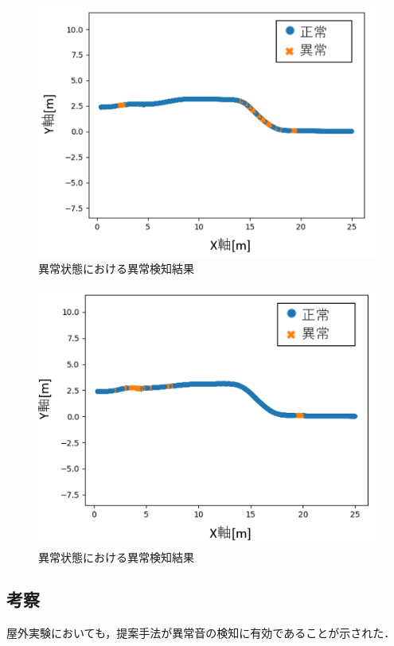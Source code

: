 \documentclass[../main]{subfiles}
\begin{document}
\begin{figure}[t]
  \centering
  \includegraphics[keepaspectratio, width=0.7\linewidth]{chap4/field_abnormal1.png}
  \caption{異常状態における異常検知結果}
  \label{fig:field_abnormal1}
\end{figure}

\begin{figure}[t]
  \centering
  \includegraphics[keepaspectratio, width=0.7\linewidth]{chap4/field_abnormal.png}
  \caption{異常状態における異常検知結果}
  \label{fig:field_abnormal}
\end{figure}


\subsection{考察}

屋外実験においても，提案手法が異常音の検知に有効であることが示された．
\end{document}
